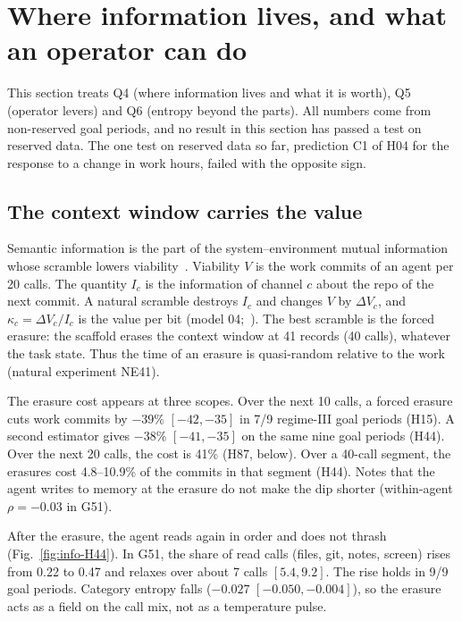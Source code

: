 \section{Where information lives, and what an operator can do}
\label{sec:information}

This section treats Q4 (where information lives and what it is worth), Q5 (operator levers) and Q6 (entropy beyond the parts).
All numbers come from non-reserved goal periods, and no result in this section has passed a test on reserved data.
The one test on reserved data so far, prediction C1 of H04 for the response to a change in work hours, failed with the opposite sign.

\subsection{The context window carries the value}
\label{sec:info-context}

Semantic information is the part of the system--environment mutual information whose scramble lowers viability~\cite{kolchinsky2018}.
Viability $V$ is the work commits of an agent per 20 calls.
The quantity $I_c$ is the information of channel $c$ about the repo of the next commit.
A natural scramble destroys $I_c$ and changes $V$ by $\Delta V_c$, and $\kappa_c=\Delta V_c/I_c$ is the value per bit (model 04;~\cite{sowinski2023}).
The best scramble is the forced erasure: the scaffold erases the context window at 41 records (40 calls), whatever the task state.
Thus the time of an erasure is quasi-random relative to the work (natural experiment NE41).

The erasure cost appears at three scopes.
Over the next 10 calls, a forced erasure cuts work commits by $-39\%$ $[-42,-35]$ in 7/9 regime-III goal periods (H15).
A second estimator gives $-38\%$ $[-41,-35]$ on the same nine goal periods (H44).
Over the next 20 calls, the cost is 41\% (H87, below).
Over a 40-call segment, the erasures cost 4.8--10.9\% of the commits in that segment (H44).
Notes that the agent writes to memory at the erasure do not make the dip shorter (within-agent $\rho=-0.03$ in G51).

After the erasure, the agent reads again in order and does not thrash (Fig.~\ref{fig:info-H44}).
In G51, the share of read calls (files, git, notes, screen) rises from 0.22 to 0.47 and relaxes over about 7 calls $[5.4, 9.2]$.
The rise holds in 9/9 goal periods.
Category entropy falls ($-0.027$ $[-0.050,-0.004]$), so the erasure acts as a field on the call mix, not as a temperature pulse.

